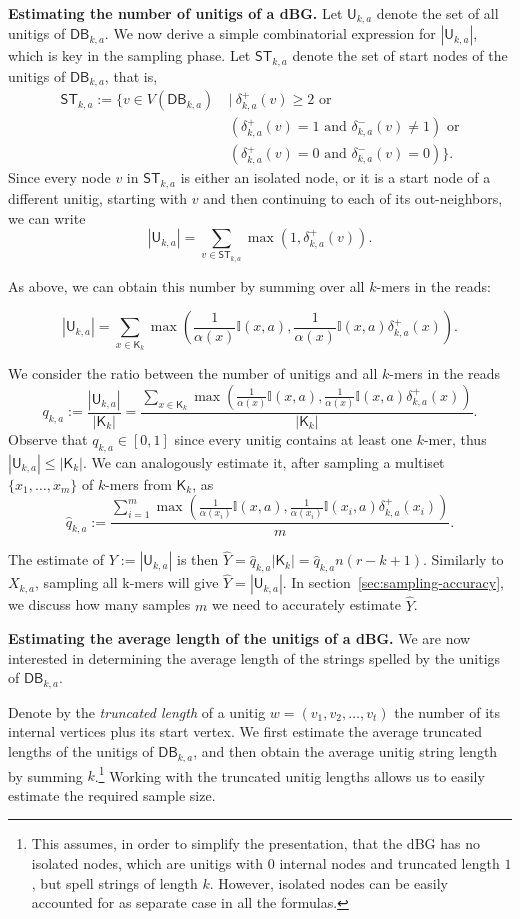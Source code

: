 \documentclass[a4paper,11pt]{article}
\newcommand{\alex}[1]{{\color{blue}{#1}}}
\newcommand{\DB}{\mathsf{DB}_{k,a}}
\newcommand{\U}{\mathsf{U}_{k,a}}
\newcommand{\ST}{\mathsf{ST}_{k,a}}
\newcommand{\dplus}{\delta^+_{k,a}}
\newcommand{\dminus}{\delta^-_{k,a}}
\newcommand{\K}{\mathsf{K}}
\newcommand{\abu}{\alpha}
\renewcommand{\geq}{\geqslant}
\renewcommand{\leq}{\leqslant}
\begin{document}
\medskip
\noindent \textbf{Estimating the number of unitigs of a dBG.} Let $\U$ denote the set of all unitigs of $\DB$. We now derive a simple combinatorial expression for $|\U|$, which is key in the sampling phase. Let $\ST$ denote the set of start nodes of the unitigs of $\DB$, that is, 
\begin{align*}
\ST := \{v \in V(\DB) \:&|\: \dplus(v) \geq 2 \text{ or } \\
& (\dplus(v) = 1 \text{ and } \dminus(v) \neq 1) \text{ or} \\
& (\dplus(v) = 0 \text{ and } \dminus(v) = 0)\}.
\end{align*}
Since every node $v$ in $\ST$ is either an isolated node, or it is a start node of a different unitig, starting with $v$ and then continuing to each of its out-neighbors, we can write
\[|\U| = \sum_{v \in \ST} \max(1,\dplus(v)).\]

As above, we can obtain this number by summing over all $k$-mers in the reads:

\[|\U| = \sum_{x \in \K_k} \max\left(\frac{1}{\abu(x)}\mathbb{I}(x,a),\frac{1}{\abu(x)}\mathbb{I}(x,a)\dplus(x)\right).\]

We consider the ratio between the number of unitigs and all $k$-mers in the reads
\[q_{k,a} := \frac{|\U|}{|\K_k|} = \frac{\sum_{x \in \K_k} \max\left(\frac{1}{\abu(x)}\mathbb{I}(x,a),\frac{1}{\abu(x)}\mathbb{I}(x,a)\dplus(x)\right)}{|\K_k|}.\]
Observe that $q_{k,a} \in [0,1]$ since every unitig contains at least one $k$-mer, thus $|\U| \leq |\K_k|$. We can analogously estimate it, after sampling a multiset $\{x_1,\dots,x_m\}$ of $k$-mers from $\K_k$, as
\[\hat{q}_{k,a} := \frac{\sum_{i = 1}^{m} \max\left(\frac{1}{\abu(x_i)}\mathbb{I}(x,a),\frac{1}{\abu(x_i)}\mathbb{I}(x_i,a)\dplus(x_i)\right)}{m}.\]

The estimate of $Y := |\U|$ is then $\hat{Y} = \hat{q}_{k,a}|\K_k| = \hat{q}_{k,a}n(r-k+1)$. Similarly to $X_{k,a}$, sampling all k-mers will give $\hat{Y} = |\U|$. In section~\ref{sec:sampling-accuracy}, we discuss how many samples $m$ we need to accurately estimate $\hat{Y}$.
\alex{say we can implement this for all abundances.}

\medskip
\noindent\textbf{Estimating the average length of the unitigs of a dBG.} We are now interested in determining the average length of the strings spelled by the unitigs of $\DB$. 

Denote by the \emph{truncated length} of a unitig $w = (v_1,v_2,\dots,v_t)$ the number of its internal vertices plus its start vertex. We first estimate the average truncated lengths of the unitigs of $\DB$, and then obtain the average unitig string length by summing $k$.\footnote{This assumes, in order to simplify the presentation, that the dBG has no isolated nodes, which are unitigs with $0$ internal nodes and truncated length $1$, but spell strings of length $k$. However, isolated nodes can be easily accounted for as separate case in all the formulas.} Working with the truncated unitig lengths allows us to easily estimate the required sample size.
\end{document}
